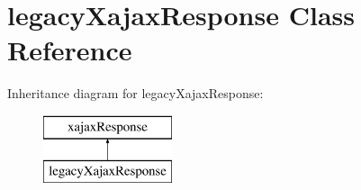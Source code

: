 \hypertarget{classlegacyXajaxResponse}{
\section{legacyXajaxResponse Class Reference}
\label{classlegacyXajaxResponse}
}
Inheritance diagram for legacyXajaxResponse:\begin{figure}[H]
\begin{center}
\leavevmode
\includegraphics[height=2.000000cm]{classlegacyXajaxResponse}
\end{center}
\end{figure}
